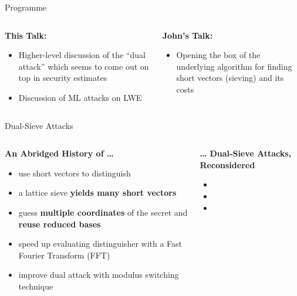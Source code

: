 \documentclass[xcolor=table,10pt,aspectratio=169]{beamer}
\begin{document}
\begin{frame}[label={sec:orgcfad446}]{Programme}
\begin{columns}[t]
\begin{column}{0.45\columnwidth}
\textbf{This Talk:}

\begin{itemize}
\item Higher-level discussion of the ``dual attack'' which seems to come out on top in security estimates
\item Discussion of ML attacks on LWE
\end{itemize}
\end{column}

\begin{column}{0.55\columnwidth}
\textbf{John's Talk:}

\begin{itemize}
\item Opening the box of the underlying algorithm for finding short vectors (sieving) and its costs
\end{itemize}
\end{column}
\end{columns}
\end{frame}

\begin{frame}[label={sec:org2730fcc}]{Dual-Sieve Attacks}
\begin{columns}
\begin{column}[t]{0.47\columnwidth}
\textbf{An Abridged History of …}

\begin{itemize}
\item \cite{Aharonov:2005:LPN} use short vectors to distinguish
\item \cite{USENIX:ADPS16} a lattice sieve \textbf{yields many short vectors}
\item \cite{EC:Albrecht17} guess \textbf{multiple coordinates} of the secret and \textbf{reuse reduced bases}
\item \cite{AC:GuoJoh21} speed up evaluating distinguisher with a Fast Fourier Transform (FFT)
\item \cite{Matzov22} improve dual attack with modulus switching technique
\end{itemize}
\end{column}

\begin{column}[t]{0.53\columnwidth}
\textbf{… Dual-Sieve Attacks, Reconsidered}

\footnotesize

\begin{itemize}
\item {}
\item {}
\item {}
\end{itemize}

\par
\end{column}
\end{columns}
\end{frame}
\end{document}
